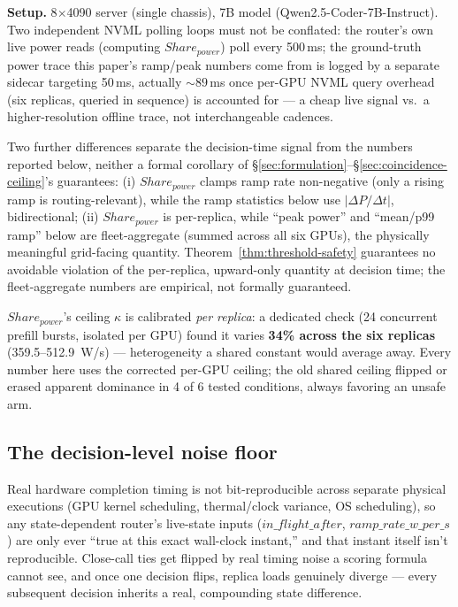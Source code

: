 \documentclass[sigconf,review,anonymous]{acmart}
\begin{document}
\textbf{Setup.} 8$\times$4090 server (single chassis), 7B model
(Qwen2.5-Coder-7B-Instruct). Two independent NVML polling loops must not be conflated: the
router's own live power reads (computing $\mathit{Share_{power}}$) poll every 500\,ms; the
ground-truth power trace this paper's ramp/peak numbers come from is logged by a separate
sidecar targeting 50\,ms, actually ${\sim}89$\,ms once per-GPU NVML query overhead (six
replicas, queried in sequence) is accounted for --- a cheap live signal vs.\ a
higher-resolution offline trace, not interchangeable cadences.

Two further differences separate the decision-time signal from the numbers reported below,
neither a formal corollary of \S\ref{sec:formulation}--\S\ref{sec:coincidence-ceiling}'s
guarantees: (i) $\mathit{Share_{power}}$ clamps ramp rate non-negative (only a rising ramp is
routing-relevant), while the ramp statistics below use $|\Delta P / \Delta t|$, bidirectional;
(ii) $\mathit{Share_{power}}$ is per-replica, while ``peak power'' and ``mean/p99 ramp'' below
are fleet-aggregate (summed across all six GPUs), the physically meaningful grid-facing
quantity. Theorem~\ref{thm:threshold-safety} guarantees no avoidable violation of the
per-replica, upward-only quantity at decision time; the fleet-aggregate numbers are empirical,
not formally guaranteed.

$\mathit{Share_{power}}$'s ceiling $\kappa$ is calibrated \emph{per replica}: a dedicated check
(24 concurrent prefill bursts, isolated per GPU) found it varies \textbf{34\% across the six
replicas} (359.5--512.9~W/s) --- heterogeneity a shared constant would average away. Every
number here uses the corrected per-GPU ceiling; the old shared ceiling flipped or erased
apparent dominance in 4 of 6 tested conditions, always favoring an unsafe arm.

\subsection{The decision-level noise floor}
\label{sec:noisefloor}

Real hardware completion timing is not bit-reproducible across separate physical executions
(GPU kernel scheduling, thermal/clock variance, OS scheduling), so any state-dependent
router's live-state inputs ($\mathit{in\_flight\_after}$, $\mathit{ramp\_rate\_w\_per\_s}$)
are only ever ``true at this exact wall-clock instant,'' and that instant itself isn't
reproducible. Close-call ties get flipped by real timing noise a scoring formula cannot see,
and once one decision flips, replica loads genuinely diverge --- every subsequent decision
inherits a real, compounding state difference.
\end{document}
